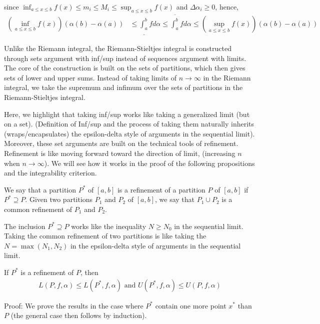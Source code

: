 \documentclass{tufte-handout}
\begin{document}
since \(\inf_{a \leq x \leq b} f(x) \leq m_i \leq M_i \leq \sup_{a \leq x \leq b} f(x) \) and 
\( \Delta \alpha_i \geq 0 \), hence, 
\begin{align}
    \left(
        \inf_{a \leq x \leq b} f(x)
    \right)
    \left(
        \alpha(b) - \alpha(a)
    \right)
    &\leq \underline{\int_{a}^{b}}fd\alpha 
    \leq \overline{\int_{a}^{b}}fd\alpha 
    \leq 
    \left(\sup_{a \leq x \leq b} f(x)
    \right)\left(
        \alpha(b) - \alpha(a)
    \right)
\end{align}

Unlike the Riemann integral, the Riemann-Stieltjes integral 
is constructed through sets argument with inf/sup instead of sequences argument with limits.
The core of the construction is built on the sets of partitions, which then gives
sets of lower and upper sums. 
Instead of taking limits of \(n \to \infty\) in the Riemann integral, we 
take the supremum and infimum over the sets of partitions in the Riemann-Stieltjes integral.

Here, we highlight that taking inf/sup works like taking a generalized limit (but on a set).
(Definition of Inf/sup and the process of taking them naturally inherits (wraps/encapsulates) 
the epsilon-delta style of arguments in the sequential limit).
Moreover, these set arguments are built on the technical tools of refinement.
Refinement is like moving forward toward the direction of limit, 
(increasing \( n \) when \(n\to \infty\)). 
We will see how it works in the proof of the following propositions and the 
integrability criterion.
\begin{Definition}[Refinement]
    We say that a partition \(P^* \) of \( [a,b] \) is a refinement 
    of a partition \( P \) of \( [a,b] \) if \( P^* \supseteq P \).
    Given two partitions \( P_1 \) and \( P_2 \) of \( [a,b] \), 
    we say that  \(P_1 \cup P_2 \) is a common refinement of \( P_1 \) and \( P_2 \).
\end{Definition}
The inclusion \( P^* \supseteq P \) works like the inequality \( N \geq N_0 \) in the sequential limit.
Taking the common refinement of two partitions is like taking the \( N = \max(N_1,N_2) \)
in the epsilon-delta style of arguments in the sequential limit.

\begin{Proposition}
    If \( P^* \) is a refinement of \( P \), then 
    \begin{align}
        L(P,f,\alpha) \leq L(P^*, f, \alpha) \text{ and } U(P^*, f, \alpha) \leq U(P, f, \alpha)
    \end{align}
\end{Proposition}
Proof: We prove the results in the case where \( P^* \) contain one more point 
\( x^* \) than \( P \) (the general case then follows by induction).
\end{document}
